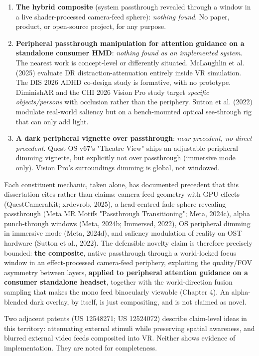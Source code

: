 \begin{enumerate}
\item \textbf{The hybrid composite} (system passthrough revealed through a window in a live shader-processed
camera-feed sphere): \textit{nothing found}. No paper, product, or open-source project, for any purpose.
\item \textbf{Peripheral passthrough manipulation for attention guidance on a standalone consumer HMD}:
\textit{nothing found as an implemented system}. The nearest work is concept-level or differently
situated. McLaughlin et al. (2025) evaluate DR distraction-attenuation entirely inside VR
simulation. The DIS 2026 ADHD co-design study is formative, with no prototype. DiminishAR and the
CHI 2026 Vision Pro study target \textit{specific objects/persons} with occlusion rather than the
periphery. Sutton et al. (2022) modulate real-world saliency but on a bench-mounted optical
see-through rig that can only add light.
\item \textbf{A dark peripheral vignette over passthrough}: \textit{near precedent, no direct precedent}. Quest OS
v67's "Theatre View" ships an adjustable peripheral dimming vignette, but explicitly not over
passthrough (immersive mode only). Vision Pro's surroundings dimming is global, not windowed.
\end{enumerate}

Each constituent mechanic, taken alone, has documented precedent that this dissertation cites rather
than claims: camera-feed geometry with GPU effects (QuestCameraKit; xrdevrob, 2025), a head-centred
fade sphere revealing passthrough (Meta MR Motifs "Passthrough Transitioning"; Meta, 2024c), alpha
punch-through windows (Meta, 2024b; Immersed, 2022), OS peripheral dimming in immersive mode (Meta,
2024d), and saliency modulation of reality on OST hardware (Sutton et al., 2022). The defensible
novelty claim is therefore precisely bounded: \textbf{the composite}, native passthrough through a
world-locked focus window in an effect-processed camera-feed periphery, exploiting the quality/FOV
asymmetry between layers, \textbf{applied to peripheral attention guidance on a consumer standalone
headset}, together with the world-direction fusion sampling that makes the mono feed binocularly
viewable (Chapter 4). An alpha-blended dark overlay, by itself, is just compositing, and is not
claimed as novel.

Two adjacent patents (US 12548271; US 12524072) describe claim-level ideas in this territory:
attenuating external stimuli while preserving spatial awareness, and blurred external video feeds
composited into VR. Neither shows evidence of implementation. They are noted for
completeness.

